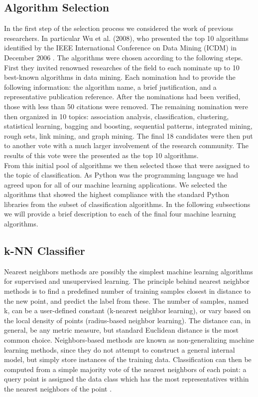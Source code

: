 \subsection{Algorithm Selection}
In the first step of the selection process we considered the work of previous researchers. In particular Wu et al. (2008), who presented the top 10 algorithms identified by the IEEE International Conference on Data Mining (ICDM) in December 2006 \cite{Wu2008}. The algorithms were chosen according to the following steps. First they invited renowned researches of the field to each nominate up to 10 best-known algorithms in data mining. Each nomination had to provide the following information: the algorithm name, a brief justification, and a representative publication reference. After the nominations had been verified, those with less than 50 citations were removed. The remaining nomination were then organized in 10 topics: association analysis, classification, clustering, statistical learning, bagging and boosting, sequential patterns, integrated mining, rough sets, link mining, and graph mining. The final 18 candidates were then put to another vote with a much larger involvement of the research community. The results of this vote were the presented as the top 10 algorithms.\\
From this initial pool of algorithms we then selected those that were assigned to the topic of classification. As Python was the programming language we had agreed upon for all of our machine learning applications. We selected the algorithms that showed the highest compliance with the standard Python libraries from the subset of classification algorithms.  
In the following subsections we will provide a brief description to each of the final four machine learning algorithms.

\subsection{k-NN Classifier} 
Nearest neighbors methods are possibly the simplest machine learning algorithms for supervised and unsupervised learning. The principle behind nearest neighbor methods is to find a predefined number of training samples closest in distance to the new point, and predict the label from these. The number of samples, named k, can be a user-defined constant (k-nearest neighbor learning), or vary based on the local density of points (radius-based neighbor learning). The distance can, in general, be any metric measure, but standard Euclidean distance is the most common choice. Neighbors-based methods are known as non-generalizing machine learning methods, since they do not attempt to construct a general internal model, but simply store instances of the training data. Classification can then be computed from a simple majority vote of the nearest neighbors of each point: a query point is assigned the data class which has the most representatives within the nearest neighbors of the point \cite{Pedregosa2011}. 

